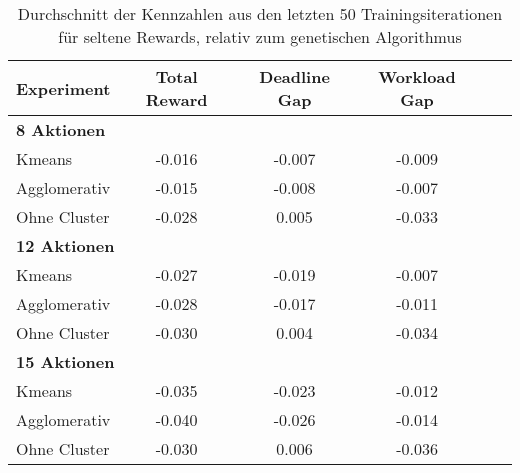 \begin{table}[ht]
\centering
\begin{tabular}{lccccc}
\hline
\textbf{Experiment} & \textbf{Total Reward} & \textbf{Deadline Gap} & \textbf{Workload Gap} \\
\hline
\multicolumn{4}{l}{\textbf{8 Aktionen}} \\
\hspace{1em}Kmeans & -0.016 & -0.007 & -0.009 \\
\hspace{1em}Agglomerativ & -0.015 & -0.008 & -0.007 \\
\hspace{1em}Ohne Cluster & -0.028 & 0.005 & -0.033 \\
\hline
\multicolumn{4}{l}{\textbf{12 Aktionen}} \\
\hspace{1em}Kmeans & -0.027 & -0.019 & -0.007 \\
\hspace{1em}Agglomerativ & -0.028 & -0.017 & -0.011 \\
\hspace{1em}Ohne Cluster & -0.030 & 0.004 & -0.034 \\
\hline
\multicolumn{4}{l}{\textbf{15 Aktionen}} \\
\hspace{1em}Kmeans & -0.035 & -0.023 & -0.012 \\
\hspace{1em}Agglomerativ & -0.040 & -0.026 & -0.014 \\
\hspace{1em}Ohne Cluster & -0.030 & 0.006 & -0.036 \\
\hline
\end{tabular}
\caption{Durchschnitt der Kennzahlen aus den letzten 50 Trainingsiterationen für seltene Rewards, relativ zum genetischen Algorithmus}
\end{table}



